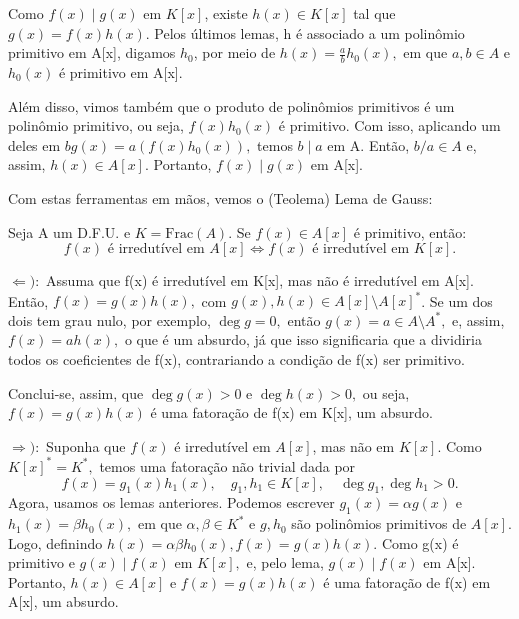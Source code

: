 \documentclass[AlgebraII/algebraII_notes.tex]{subfiles}
\begin{document}
\begin{proof*}
	Como \(f(x)\mid g(x)\) em \(K[x]\), existe \(h(x)\in K[x]\) tal que \(g(x) = f(x)h(x).\) Pelos últimos lemas,
	h é associado a um polinômio primitivo em A[x], digamos \(h_{0}\), por meio de \(h(x) = \frac{a}{b}h_{0}(x),\) em que \(a, b\in A\) e
	\(h_{0}(x)\) é primitivo em A[x].

	Além disso, vimos também que o produto de polinômios primitivos é um polinômio primitivo, ou seja, \(f(x)h_{0}(x)\) é primitivo. Com isso,
	aplicando um deles em \(bg(x) = a(f(x)h_{0}(x)),\) temos \(b\mid a\) em A. Então, \(b/a\in A\) e, assim, \(h(x)\in A[x].\)
	Portanto, \(f(x)\mid g(x)\) em A[x]. \qedsymbol
\end{proof*}
Com estas ferramentas em mãos, vemos o (Teolema) Lema de Gauss:
\begin{theorem*}
	Seja A um D.F.U. e \(K = \mathrm{Frac}(A).\) Se \(f(x)\in A[x]\) é primitivo, então:
	\[
		f(x) \text{ é irredutível em }A[x] \Longleftrightarrow f(x) \text{ é irredutível em }K[x].
	\]
\end{theorem*}
\begin{proof*}
	\(\Leftarrow ):\) Assuma que f(x) é irredutível em K[x], mas não é irredutível em A[x]. Então, \(f(x) = g(x)h(x),\) com
	\(g(x), h(x)\in A[x]\setminus{A[x]^{*}}\). Se um dos dois tem grau nulo, por exemplo, \(\deg{g} = 0, \) então
	\(g(x) = a\in A\setminus{A^{*}},\) e, assim, \(f(x) = ah(x),\) o que é um absurdo, já que isso significaria que
	a dividiria todos os coeficientes de f(x), contrariando a condição de f(x) ser primitivo.

	Conclui-se, assim, que \(\deg{g(x)} > 0\) e \(\deg{h(x)} > 0,\) ou seja, \(f(x) = g(x)h(x)\) é uma fatoração de
	f(x) em K[x], um absurdo.

	\(\Rightarrow ):\) Suponha que \(f(x)\) é irredutível em \(A[x]\), mas não em \(K[x]\). Como \(K[x]^{*} = K^{*},\) temos uma
	fatoração não trivial dada por
	\[
		f(x) = g_{1}(x)h_{1}(x),\quad g_{1}, h_{1}\in K[x],\quad \deg{g_{1}}, \deg{h_{1}} > 0.
	\]
	Agora, usamos os lemas anteriores. Podemos escrever \(g_{1}(x) = \alpha g(x)\) e \(h_{1}(x) = \beta h_{0}(x),\) em que \(\alpha , \beta \in K^{*}\)
	e \(g, h_{0}\) são polinômios primitivos de \(A[x].\) Logo, definindo \(h(x) = \alpha \beta h_{0}(x), f(x) = g(x)h(x).\) Como g(x) é primitivo e
	\(g(x)\mid f(x)\) em \(K[x],\) e, pelo lema, \(g(x)\mid f(x)\) em A[x]. Portanto, \(h(x)\in A[x]\) e \(f(x) = g(x)h(x)\) é uma fatoração de f(x) em A[x],
	um absurdo. \qedsymbol
\end{proof*}
\end{document}
